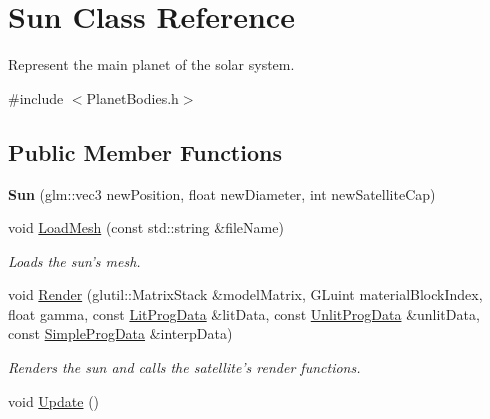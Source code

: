 \hypertarget{class_sun}{\section{Sun Class Reference}
\label{class_sun}
}


Represent the main planet of the solar system.  




{\ttfamily \#include $<$Planet\-Bodies.\-h$>$}

\subsection*{Public Member Functions}
\begin{DoxyCompactItemize}
\item 
\hypertarget{class_sun_aa345e142fa2d4d0c5e22e4472cba374a}{{\bfseries Sun} (glm\-::vec3 new\-Position, float new\-Diameter, int new\-Satellite\-Cap)}\label{class_sun_aa345e142fa2d4d0c5e22e4472cba374a}

\item 
\hypertarget{class_sun_a3f3680c0b94268b85cc06e7eff70cb07}{void \hyperlink{class_sun_a3f3680c0b94268b85cc06e7eff70cb07}{Load\-Mesh} (const std\-::string \&file\-Name)}\label{class_sun_a3f3680c0b94268b85cc06e7eff70cb07}

\begin{DoxyCompactList}\small\item\em Loads the sun's mesh. \end{DoxyCompactList}\item 
void \hyperlink{class_sun_a736012a1d04686497506fe25636bcdbb}{Render} (glutil\-::\-Matrix\-Stack \&model\-Matrix, G\-Luint material\-Block\-Index, float gamma, const \hyperlink{struct_lit_prog_data}{Lit\-Prog\-Data} \&lit\-Data, const \hyperlink{struct_unlit_prog_data}{Unlit\-Prog\-Data} \&unlit\-Data, const \hyperlink{struct_simple_prog_data}{Simple\-Prog\-Data} \&interp\-Data)
\begin{DoxyCompactList}\small\item\em Renders the sun and calls the satellite's render functions. \end{DoxyCompactList}\item 
\hypertarget{class_sun_af3bfaeceea178c017478d25afa0dff07}{void \hyperlink{class_sun_af3bfaeceea178c017478d25afa0dff07}{Update} ()}\label{class_sun_af3bfaeceea178c017478d25afa0dff07}


\end{DoxyCompactItemize}
